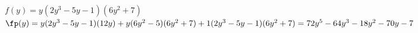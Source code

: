 {$f(y)= y(2y^3-5y-1)(6y^2+7)$}
{$\fp(y)=y(2y^3-5y-1)(12y)+y(6y^2-5)(6y^2+7)+1(2y^3-5y-1)(6y^2+7)=72 y^5-64 y^3-18 y^2-70 y-7$}
